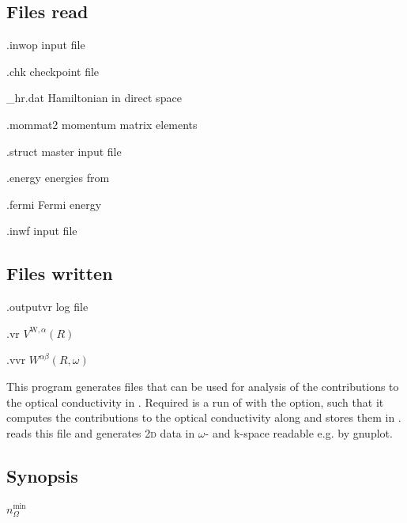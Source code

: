 \subsection{Files read}
\begin{options}
\item[\case.inwop] input file
\item[\case.chk] \wannier checkpoint file
\item[\case{}\_hr.dat] Hamiltonian in direct space
\item[\case.mommat2] momentum matrix elements
\item[\case.struct] \wien master input file 
\item[\case.energy] energies from \lapwi {}
\item[\case.fermi] Fermi energy 
\item[\case.inwf] \wiiw input file 
\end{options}

\subsection{Files written}
\begin{options}
\item[\case.outputvr] log file
\item[\case.vr] $V^{\text{W},α}(R)$
\item[\case.vvr] $W^{αβ}(R, ω)$ 
\end{options}



This program generates files that can be used for analysis of the
contributions to the optical conductivity in \woptic.  Required is a
run of \woprog with the  option, such that it computes the
contributions to the optical conductivity along
 and stores them in
.  \kanalysis reads this file and
generates 2\textsc{d} data in $ω$- and k-space readable e.g. by
gnuplot.

\subsection{Synopsis}
\newcommand*\Nfreq{$n_{Ω}^\text{min}$\xspace}
\begin{usage}
  \kanalysis \Nfreq {}
\end{usage}

